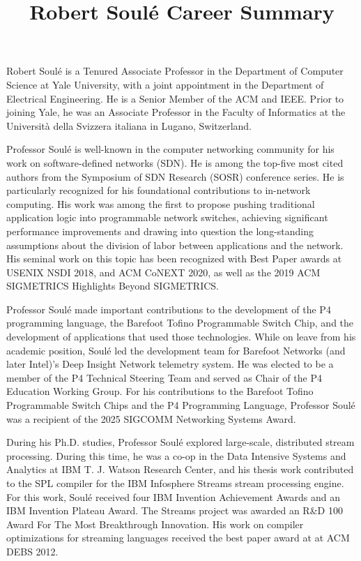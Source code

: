\documentclass[11pt]{article}
\title{ Robert Soul\'{e} Career Summary}
\author{  }
\date{ }
\begin{document}
\maketitle	
\thispagestyle{empty}


Robert Soul\'{e} is a Tenured Associate Professor in the Department of
Computer Science at Yale University, with a joint appointment in the
Department of Electrical Engineering. He is a Senior Member of 
the ACM and IEEE.  Prior to joining Yale, he was an Associate
Professor in the Faculty of Informatics at the Universit\`{a} della
Svizzera italiana in Lugano, Switzerland.



Professor Soul\'{e} is well-known in the computer networking community
for his work on software-defined networks (SDN). He is among the
top-five most cited authors from the Symposium of SDN Research (SOSR)
conference series. He is particularly recognized for his foundational
contributions to in-network computing.  His work was among the first
to propose pushing traditional application logic into programmable
network switches, achieving significant performance improvements and drawing
into question the long-standing assumptions about the division of
labor between applications and the network. His seminal work on this topic has
been recognized with Best Paper awards at USENIX NSDI 2018, and ACM CoNEXT 2020,
as well as the 2019 ACM SIGMETRICS Highlights Beyond SIGMETRICS.


Professor Soul\'{e} made important contributions to the development of the P4
programming language, the Barefoot Tofino Programmable Switch Chip,
and the development of applications that used those
technologies. While on leave from his academic position, Soul\'{e} led
the development team for Barefoot Networks (and later Intel)'s Deep
Insight Network telemetry system. He was elected to be a member of the
P4 Technical Steering Team and served as Chair of the P4 Education
Working Group. For his contributions to the Barefoot Tofino
Programmable Switch Chips and the P4 Programming Language, Professor
Soul\'{e} was a recipient of the 2025 SIGCOMM Networking Systems
Award.


During his Ph.D. studies, Professor Soul\'{e} explored large-scale,
distributed stream processing. During this time, he was a co-op in the
Data Intensive Systems and Analytics at IBM T. J. Watson Research
Center, and his thesis work contributed to the SPL compiler for the
IBM Infosphere Streams stream processing engine. For this work,
Soul\'{e} received four IBM Invention Achievement Awards and an IBM
Invention Plateau Award. The Streams project was awarded an R\&D 100
Award For The Most Breakthrough Innovation.  His work on compiler
optimizations for streaming languages received the best paper award at
at ACM DEBS 2012.
\end{document}
